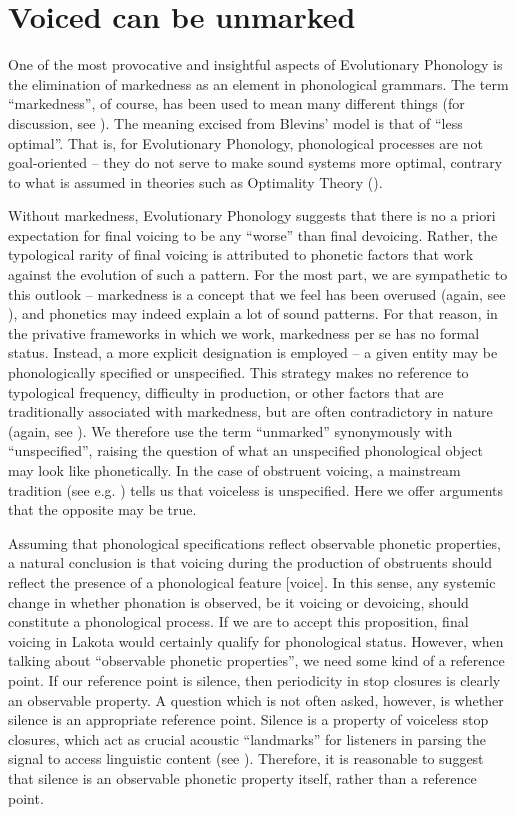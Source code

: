 \documentclass[output=paper]{langscibook}
\begin{document}
\section{Voiced can be unmarked}
\label{sec:schwartz:3}

One of the most provocative and insightful aspects of Evolutionary Phonology is the elimination of markedness as an element in phonological grammars. The term “markedness”, of course, has been used to mean many different things (for discussion, see \citealt{Hume2011}). The meaning excised from Blevins’ model is that of “less optimal”. That is, for Evolutionary Phonology, phonological processes are not goal-oriented – they do not serve to make sound systems more optimal, contrary to what is assumed in theories such as Optimality Theory (\citealt{PrinceSmolensky1993}). 

Without markedness, Evolutionary Phonology suggests that there is no a priori expectation for final voicing to be any “worse” than final devoicing. Rather, the typological rarity of final voicing is attributed to phonetic factors that work against the evolution of such a pattern. For the most part, we are sympathetic to this outlook – markedness is a concept that we feel has been overused (again, see \citealt{Hume2011}), and phonetics may indeed explain a lot of sound patterns. For that reason, in the privative frameworks in which we work, markedness per se has no formal status. Instead, a more explicit designation is employed – a given entity may be phonologically specified or unspecified. This strategy makes no reference to typological frequency, difficulty in production, or other factors that are traditionally associated with markedness, but are often contradictory in nature (again, see \citealt{Hume2011}). We therefore use the term “unmarked” synonymously with “unspecified”, raising the question of what an unspecified phonological object may look like phonetically. In the case of obstruent voicing, a mainstream tradition (see e.g. \citealt{BeckmanEtAl2013}) tells us that voiceless is unspecified. Here we offer arguments that the opposite may be true.

Assuming that phonological specifications reflect observable phonetic properties, a natural conclusion is that voicing during the production of obstruents should reflect the presence of a phonological feature [voice]. In this sense, any systemic change in whether phonation is observed, be it voicing or devoicing, should constitute a phonological process. If we are to accept this proposition, final voicing in Lakota would certainly qualify for phonological status. However, when talking about “observable phonetic properties”, we need some kind of a reference point. If our reference point is silence, then periodicity in stop closures is clearly an observable property. A question which is not often asked, however, is whether silence is an appropriate reference point. Silence is a property of voiceless stop closures, which act as crucial acoustic “landmarks” for listeners in parsing the signal to access linguistic content (see \citealt{Stevens2002}). Therefore, it is reasonable to suggest that silence is an observable phonetic property itself, rather than a reference point.
\end{document}
